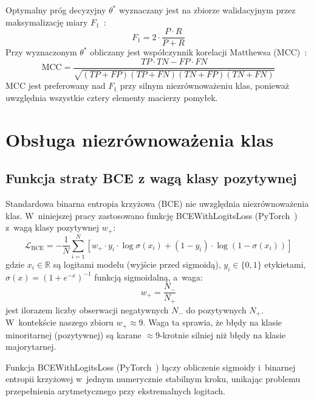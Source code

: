 \documentclass{SGGW-thesis}
\begin{document}
Optymalny próg decyzyjny $\theta^*$ wyznaczany jest na zbiorze walidacyjnym przez maksymalizację
miary $F_1$~\cite{davis2006}:
\begin{equation}
    F_1 = 2 \cdot \frac{P \cdot R}{P + R}
    \label{eq:f1}
\end{equation}
Przy wyznaczonym $\theta^*$ obliczany jest współczynnik korelacji Matthewsa (MCC)~\cite{davis2006}:
\begin{equation}
    \mathrm{MCC} = \frac{TP \cdot TN - FP \cdot FN}{\sqrt{(TP+FP)(TP+FN)(TN+FP)(TN+FN)}}
    \label{eq:mcc}
\end{equation}
MCC jest preferowany nad $F_1$ przy silnym niezrównoważeniu klas, ponieważ uwzględnia wszystkie
cztery elementy macierzy pomyłek.

\section{Obsługa niezrównoważenia klas}
\label{sec:imbalance}

\subsection{Funkcja straty BCE z wagą klasy pozytywnej}

Standardowa binarna entropia krzyżowa (BCE) nie uwzględnia niezrównoważenia klas. W~niniejszej
pracy zastosowano funkcję BCEWithLogitsLoss (PyTorch~\cite{paszke2019}) z~wagą klasy pozytywnej $w_+$:
\begin{equation}
    \mathcal{L}_{\mathrm{BCE}} = -\frac{1}{N}\sum_{i=1}^{N}\!\left[w_+ \cdot y_i \cdot \log\sigma(x_i) + (1-y_i)\cdot\log\!\left(1-\sigma(x_i)\right)\right]
    \label{eq:bce}
\end{equation}
gdzie $x_i \in \mathbb{R}$ są logitami modelu (wyjście przed sigmoidą), $y_i \in \{0,1\}$ etykietami,
$\sigma(x) = (1+e^{-x})^{-1}$ funkcją sigmoidalną, a~waga:
\begin{equation}
    w_+ = \frac{N_-}{N_+}
    \label{eq:posweight}
\end{equation}
jest ilorazem liczby obserwacji negatywnych $N_-$ do pozytywnych $N_+$. W~kontekście naszego zbioru
$w_+ \approx 9$. Waga ta sprawia, że błędy na klasie minoritarnej (pozytywnej) są karane $\approx9$-krotnie
silniej niż błędy na klasie majorytarnej.

Funkcja BCEWithLogitsLoss (PyTorch~\cite{paszke2019}) łączy obliczenie sigmoidy
i~binarnej entropii krzyżowej w~jednym numerycznie stabilnym kroku, unikając problemu przepełnienia
arytmetycznego przy ekstremalnych logitach.
\end{document}
